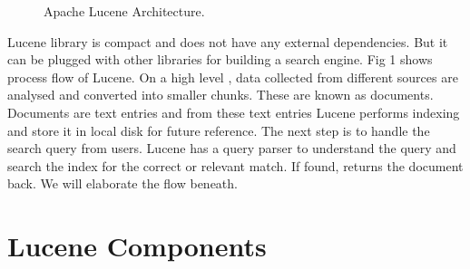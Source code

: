 \documentclass[9pt,twocolumn,twoside]{../../styles/osajnl}
\begin{document}
\begin{figure}[htbp]
\centering
{}
\caption{Apache Lucene Architecture.}
\label{fig:lucene-data-flow}
\end{figure}

Lucene library is compact and does not have any external dependencies. But it can be plugged with other libraries for building a search engine. Fig 1\cite{lucene-book} shows process flow of Lucene. On a high level , data collected from different sources are analysed and converted into smaller chunks. These are known as documents. Documents are text entries and from these text entries Lucene performs indexing and store it in local disk for future reference. The next step is to handle the search query from users. Lucene has a query parser to understand the query and search the index for the correct or relevant match. If found, returns the document back. We will elaborate the flow beneath.

\section{Lucene Components}
\end{document}
